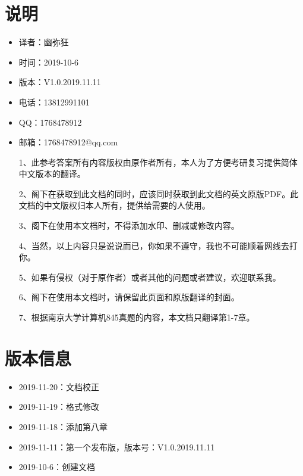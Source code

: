 \documentclass[11pt,UTF8,twoside]{article}
\begin{document}
	\part{说明}
	\begin{itemize}
		\item 译者：幽弥狂
		
		\item 时间：2019-10-6
		
		\item 版本：V1.0.2019.11.11
		
		\item 电话：13812991101
		
		\item QQ：1768478912
		
		\item 邮箱：1768478912@qq.com
		
		1、此参考答案所有内容版权由原作者所有，本人为了方便考研复习提供简体中文版本的翻译。
		
		2、阁下在获取到此文档的同时，应该同时获取到此文档的英文原版PDF。此文档的中文版权归本人所有，提供给需要的人使用。
		
		3、阁下在使用本文档时，不得添加水印、删减或修改内容。
		
		4、当然，以上内容只是说说而已，你如果不遵守，我也不可能顺着网线去打你。
		
		5、如果有侵权（对于原作者）或者其他的问题或者建议，欢迎联系我。
		
		6、阁下在使用本文档时，请保留此页面和原版翻译的封面。
		
		7、根据南京大学计算机845真题的内容，本文档只翻译第1-7章。
	\end{itemize}

	\newpage
\pagestyle{fancy}
\fancyhf{}  %
\pagestyle{fancy}
\part{版本信息}
\begin{itemize}
	\item 2019-11-20：文档校正
	\item 2019-11-19：格式修改
	\item 2019-11-18：添加第八章
	\item 2019-11-11：第一个发布版，版本号：V1.0.2019.11.11
	\item 2019-10-6：创建文档	
\end{itemize}
	\newpage
	\setcounter{page}{1}
    \pagestyle{fancy}
    \fancyhf{}  %
    \pagestyle{fancy}
\end{document}
